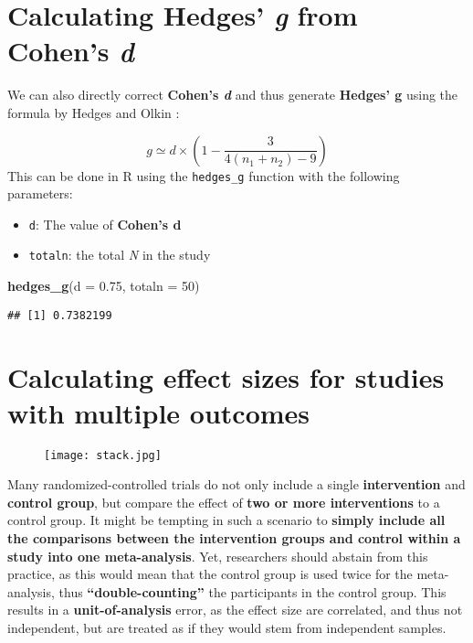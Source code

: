 \documentclass[]{book}
\newenvironment{Shaded}{\begin{snugshade}}{\end{snugshade}}
\newcommand{\KeywordTok}[1]{\textcolor[rgb]{0.13,0.29,0.53}{\textbf{#1}}}
\newcommand{\DataTypeTok}[1]{\textcolor[rgb]{0.13,0.29,0.53}{#1}}
\newcommand{\DecValTok}[1]{\textcolor[rgb]{0.00,0.00,0.81}{#1}}
\newcommand{\FloatTok}[1]{\textcolor[rgb]{0.00,0.00,0.81}{#1}}
\newcommand{\NormalTok}[1]{#1}
\providecommand{\tightlist}{%
  \setlength{\itemsep}{0pt}\setlength{\parskip}{0pt}}
\theoremstyle{definition}
\theoremstyle{definition}
\theoremstyle{definition}
\theoremstyle{remark}
\begin{document}
\hypertarget{h}{\section{\texorpdfstring{Calculating Hedges' \emph{g}
from Cohen's \emph{d}}{Calculating Hedges' g from Cohen's d}}\label{h}}

We can also directly correct \textbf{Cohen's \emph{d} } and thus
generate \textbf{Hedges' g} using the formula by Hedges and Olkin
\citep{hedges1985statistical}:

\[g \simeq d\times(1-\frac{3}{4(n_1+n_2)-9}) \] This can be done in R
using the \texttt{hedges\_g} function with the following parameters:

\begin{itemize}
\tightlist
\item
  \texttt{d}: The value of \textbf{Cohen's d}
\item
  \texttt{totaln}: the total \emph{N} in the study
\end{itemize}

\begin{Shaded}
\begin{Highlighting}[]
\KeywordTok{hedges_g}\NormalTok{(}\DataTypeTok{d =} \FloatTok{0.75}\NormalTok{, }\DataTypeTok{totaln =} \DecValTok{50}\NormalTok{)}
\end{Highlighting}
\end{Shaded}

\begin{verbatim}
## [1] 0.7382199
\end{verbatim}

\section{Calculating effect sizes for studies with multiple
outcomes}\label{i}

\begin{figure}
\centering
\texttt{[image: stack.jpg]}
\caption{}
\end{figure}

Many randomized-controlled trials do not only include a single
\textbf{intervention} and \textbf{control group}, but compare the effect
of \textbf{two or more interventions} to a control group. It might be
tempting in such a scenario to \textbf{simply include all the
comparisons between the intervention groups and control within a study
into one meta-analysis}. Yet, researchers should abstain from this
practice, as this would mean that the control group is used twice for
the meta-analysis, thus \textbf{``double-counting''} the participants in
the control group. This results in a \textbf{unit-of-analysis} error, as
the effect size are correlated, and thus not independent, but are
treated as if they would stem from independent samples.
\end{document}
